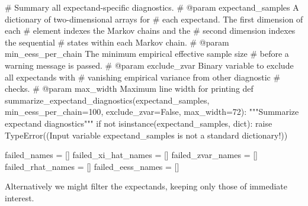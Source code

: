 \documentclass[
  letterpaper,
  DIV=11,
  numbers=noendperiod]{scrartcl}
\newenvironment{Shaded}{\begin{snugshade}}{\end{snugshade}}
\newcommand{\BuiltInTok}[1]{\textcolor[rgb]{0.00,0.23,0.31}{#1}}
\newcommand{\CommentTok}[1]{\textcolor[rgb]{0.37,0.37,0.37}{#1}}
\newcommand{\ControlFlowTok}[1]{\textcolor[rgb]{0.00,0.23,0.31}{#1}}
\newcommand{\DecValTok}[1]{\textcolor[rgb]{0.68,0.00,0.00}{#1}}
\newcommand{\KeywordTok}[1]{\textcolor[rgb]{0.00,0.23,0.31}{#1}}
\newcommand{\NormalTok}[1]{\textcolor[rgb]{0.00,0.23,0.31}{#1}}
\newcommand{\OperatorTok}[1]{\textcolor[rgb]{0.37,0.37,0.37}{#1}}
\newcommand{\PreprocessorTok}[1]{\textcolor[rgb]{0.68,0.00,0.00}{#1}}
\newcommand{\StringTok}[1]{\textcolor[rgb]{0.13,0.47,0.30}{#1}}
\newcommand{\VariableTok}[1]{\textcolor[rgb]{0.07,0.07,0.07}{#1}}
\begin{document}
\begin{Shaded}
\begin{Highlighting}[]
\CommentTok{\# Summary all expectand{-}specific diagnostics.}
\CommentTok{\# @param expectand\_samples A dictionary of two{-}dimensional arrays for }
\CommentTok{\#                          each expectand.  The first dimension of each}
\CommentTok{\#                          element indexes the Markov chains and the }
\CommentTok{\#                          second dimension indexes the sequential }
\CommentTok{\#                          states within each Markov chain.}
\CommentTok{\# @param min\_eess\_per\_chain The minimum empirical effective sample size}
\CommentTok{\#                           before a warning message is passed.}
\CommentTok{\# @param exclude\_zvar Binary variable to exclude all expectands with}
\CommentTok{\#                     vanishing empirical variance from other diagnostic}
\CommentTok{\#                     checks.}
\CommentTok{\# @param max\_width Maximum line width for printing}
\KeywordTok{def}\NormalTok{ summarize\_expectand\_diagnostics(expectand\_samples,}
\NormalTok{                                    min\_eess\_per\_chain}\OperatorTok{=}\DecValTok{100}\NormalTok{,}
\NormalTok{                                    exclude\_zvar}\OperatorTok{=}\VariableTok{False}\NormalTok{,}
\NormalTok{                                    max\_width}\OperatorTok{=}\DecValTok{72}\NormalTok{):}
  \CommentTok{"""Summarize expectand diagnostics"""}
  \ControlFlowTok{if} \KeywordTok{not} \BuiltInTok{isinstance}\NormalTok{(expectand\_samples, }\BuiltInTok{dict}\NormalTok{):}
    \ControlFlowTok{raise} \PreprocessorTok{TypeError}\NormalTok{((}\StringTok{\textquotesingle{}Input variable \textasciigrave{}expectand\_samples\textasciigrave{} \textquotesingle{}}
           \StringTok{\textquotesingle{}is not a standard dictionary!\textquotesingle{}}\NormalTok{))}
  
\NormalTok{  failed\_names }\OperatorTok{=}\NormalTok{ []}
\NormalTok{  failed\_xi\_hat\_names }\OperatorTok{=}\NormalTok{ []}
\NormalTok{  failed\_zvar\_names }\OperatorTok{=}\NormalTok{ []}
\NormalTok{  failed\_rhat\_names }\OperatorTok{=}\NormalTok{ []}
\NormalTok{  failed\_eess\_names }\OperatorTok{=}\NormalTok{ []}
\end{Highlighting}
\end{Shaded}

Alternatively we might filter the expectands, keeping only those of
immediate interest.
\end{document}
